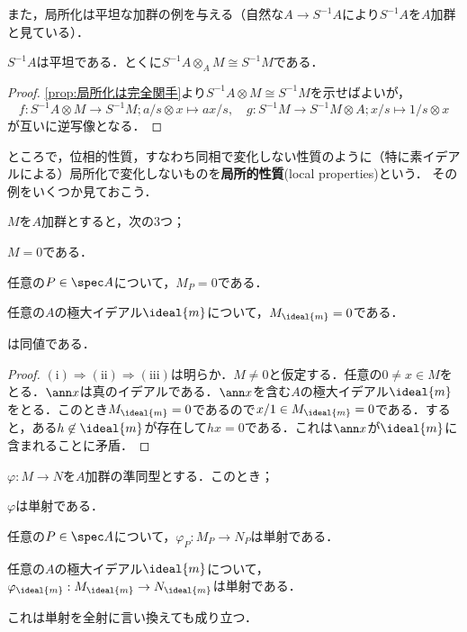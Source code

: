 また，局所化は平坦な加群の例を与える（自然な$A\to S^{-1}A$により$S^{-1}A$を$A$加群と見ている）．
\begin{prop}\label{prop:局所化は平坦}
	$S^{-1}A$は平坦である．とくに$S^{-1}A\otimes_A M\cong S^{-1}M$である．
\end{prop}

\begin{proof}
	\ref{prop:局所化は完全関手}より$S^{-1}A\otimes M\cong S^{-1}M$を示せばよいが，	
	\[f:S^{-1}A\otimes M\to S^{-1}M;a/s\otimes x\mapsto ax/s,\quad g:S^{-1}M\to S^{-1}M\otimes A;x/s\mapsto 1/s\otimes x\]
	が互いに逆写像となる．
\end{proof}

ところで，位相的性質，すなわち同相で変化しない性質のように（特に素イデアルによる）局所化で変化しないものを\textbf{局所的性質}(local properties)という． その例をいくつか見ておこう．

\begin{prop}\label{prop:局所化したら0は局所的}
	$M$を$A$加群とすると，次の3つ；
	\begin{sakura}
		\item $M=0$である．
		\item 任意の$P\in \spec A$について，$M_P=0$である．
		\item 任意の$A$の極大イデアル$\ideal{m}$について，$M_{\ideal{m}}=0$である．
	\end{sakura}
	は同値である．
\end{prop}

\begin{proof}
	$(\text{i})\Longrightarrow(\text{ii})\Longrightarrow(\text{iii})$は明らか．$M\neq0$と仮定する．任意の$0\neq x\in M$をとる．$\ann x$は真のイデアルである．$\ann x$を含む$A$の極大イデアル$\ideal{m}$をとる．このとき$M_{\ideal{m}}=0$であるので$x/1\in M_{\ideal{m}}=0$である．すると，ある$h\not\in\ideal{m}$が存在して$hx=0$である．これは$\ann x$が$\ideal{m}$に含まれることに矛盾．
\end{proof}

\begin{prop}\label{prop:局所的性質}
	$\varphi:M\to N$を$A$加群の準同型とする．このとき；
	\begin{sakura}
		\item $\varphi$は単射である．
		\item 任意の$P\in\spec A$について，$\varphi_P:M_P\to N_P$は単射である．
		\item 任意の$A$の極大イデアル$\ideal{m}$について，
		$\varphi_{\ideal{m}}:M_{\ideal{m}}\to N_{\ideal{m}}$は単射である．
	\end{sakura}
	これは単射を全射に言い換えても成り立つ．
\end{prop}

